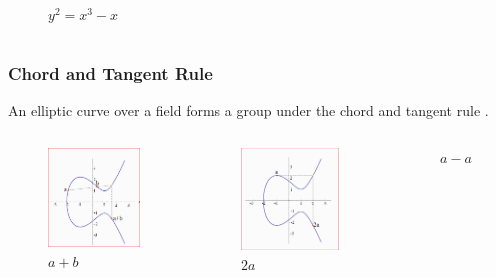 \documentclass[xcolor=pdftex,dvipsnames,table]{beamer}
\theoremstyle{plain}
\theoremstyle{definition}
\begin{document}
\begin{frame}
\begin{columns}
\begin{figure}
		\caption{$y^2=x^3-x$}
	\end{figure}
	\end{columns}
\end{frame}

\begin{frame}
	\frametitle{Chord and Tangent Rule}
	
	An elliptic curve over a field forms a group under the chord and tangent rule \cite{Galbraith}.
	\begin{columns}
	\begin{figure}
		\centering
		\includegraphics[scale=.2]{p_plus_q.png}
		\caption{$a+b$}
	\end{figure}
	
	\begin{figure}
		\centering
		\includegraphics[scale=.2]{p_plus_p.png}
		\caption{$2a$}
	\end{figure}
	\begin{figure}
		\centering
		\caption{$a-a$}
	\end{figure}
	\end{columns}
\end{frame}
\end{document}
